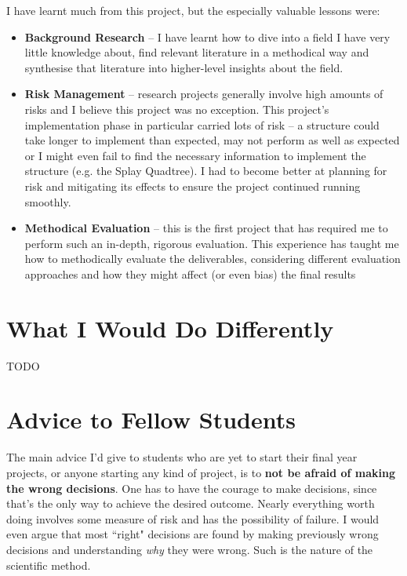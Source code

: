 I have learnt much from this project, but the especially valuable lessons were:
\begin{itemize}
	\item \textbf{Background Research} -- I have learnt how to dive into a field I have very little knowledge about, find relevant literature in a methodical way and synthesise that literature into higher-level insights about the field.
	\item \textbf{Risk Management} -- research projects generally involve high amounts of risks and I believe this project was no exception. This project's implementation phase in particular carried lots of risk -- a structure could take longer to implement than expected, may not perform as well as expected or I might even fail to find the necessary information to implement the structure (e.g. the Splay Quadtree). I had to become better at planning for risk and mitigating its effects to ensure the project continued running smoothly.
	\item \textbf{Methodical Evaluation} -- this is the first project that has required me to perform such an in-depth, rigorous evaluation. This experience has taught me how to methodically evaluate the deliverables, considering different evaluation approaches and how they might affect (or even bias) the final results
\end{itemize}

\section{What I Would Do Differently}

TODO

\section{Advice to Fellow Students}

The main advice I'd give to students who are yet to start their final year projects, or anyone starting any kind of project, is to \textbf{not be afraid of making the wrong decisions}. One has to have the courage to make decisions, since that's the only way to achieve the desired outcome. Nearly everything worth doing involves some measure of risk and has the possibility of failure. I would even argue that most ``right" decisions are found by making previously wrong decisions and understanding \textit{why} they were wrong. Such is the nature of the scientific method.


